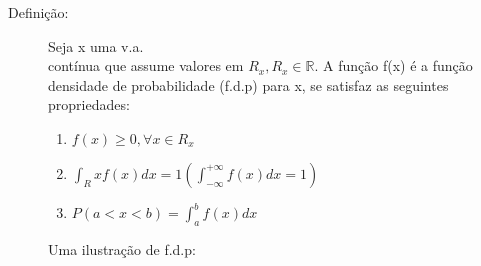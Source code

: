    \begin{description}
     \item [Definição:] Seja x uma v.a.\\ contínua que assume valores em $R_{x},R_{x} \in \mathbb{R}$.
       A função f(x) é a função densidade de probabilidade (f.d.p) para x, se satisfaz as 
       seguintes propriedades: 


       \begin{enumerate}[label=(\roman*)]
         \item $f(x)\geq 0, \forall x \in R_{x}$
         \item $\int_R{x} f(x) dx=1 (\int_{- \infty}^{+ \infty} f(x)dx=1)$
         \item $P(a<x<b)=\int^b_a f(x) dx $
       \end{enumerate}
       Uma ilustração de f.d.p: 
       \begin{figure}[htpb]
         \centering
         
         \caption{}
         \label{fig:25}


\end{figure}
\end{description}
